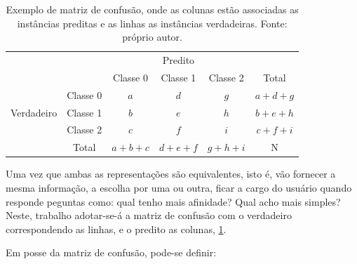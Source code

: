 \begin{table}[hhh]
\begin{tabular}{l|l|c|c|c|c}
\multicolumn{2}{c}{}&\multicolumn{3}{c}{Predito}&\\ \cline{3-5}
\multicolumn{2}{c|}{}&Classe 0& Classe 1 & Classe 2&\multicolumn{1}{c}{Total}\\ \cline{2-5}
\multirow{3}{*}{Verdadeiro}& Classe 0 & $a$ & $d$ & $g$ & $a+d+g$\\ \cline{2-5}
                           & Classe 1 & $b$ & $e$ & $h$ & $b+e+h$\\ \cline{2-5}
                           & Classe 2 & $c$ & $f$ & $i$ & $c+f+i$\\ \cline{2-5}
\multicolumn{1}{c}{} & \multicolumn{1}{c}{Total} & \multicolumn{1}{c}{$a+b+c$} & \multicolumn{    1}{c}{$d+e+f$} & \multicolumn{1}{c}{$g+h+i$} & \multicolumn{1}{c}{N}\\
\end{tabular}
\caption{Exemplo de matriz de confusão, onde as colunas estão associadas as instâncias preditas e as linhas as instâncias verdadeiras. Fonte: próprio autor.}
\label{tab:mc2}
\end{table}

Uma vez que ambas as representações são equivalentes, isto é, vão fornecer a mesma informação, a escolha por uma ou outra, ficar a cargo do usuário quando responde peguntas como: qual tenho mais afinidade? Qual acho mais simples? Neste, trabalho adotar-se-á a matriz de confusão com o verdadeiro correspondendo as linhas, e o predito as colunas, \ref{tab:mc2}.

Em posse da matriz de confusão, pode-se definir:

